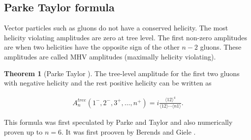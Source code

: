 \documentclass{article}
\theoremstyle{definition}
\newtheorem{theorem}{Theorem}[section]
\numberwithin{equation}{section}
\begin{document}
\subsection{Parke Taylor formula}

Vector particles such as gluons do not have a conserved helicity. The most helicity violating amplitudes are zero at tree level. The first non-zero amplitudes are when two helicities have the opposite sign of the other $n-2$ gluons. These amplitudes are called MHV amplitudes (maximally helicity violating).

\begin{theorem}[Parke Taylor \cite{pt86}]

The tree-level amplitude for the first two gluons with negative helicity and the rest positive helicity can be written as

\begin{align}
    A_n^{tree}(1^{-}, 2^{-}, 3^{+}, \dots , n^{+}) = i \frac{\langle 12 \rangle^4}{\langle 12 \rangle \cdots \langle n1 \rangle}.
\end{align}

This formula was first speculated by Parke and Taylor and also numerically proven up to $n=6$. It was first prooven by Berends and Giele \cite{bg88recursive}.

\end{theorem}
\end{document}
